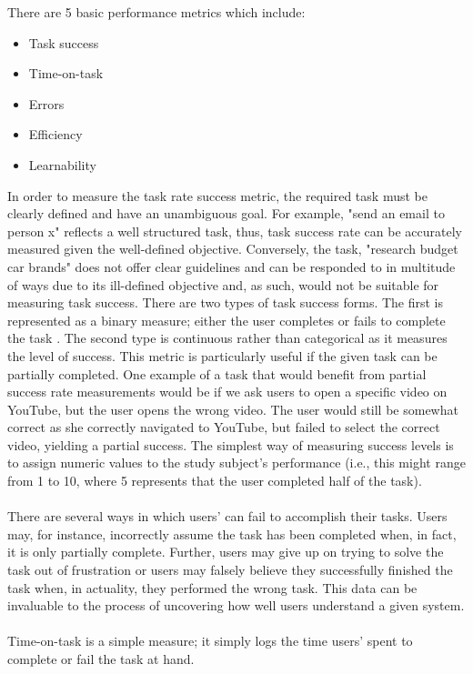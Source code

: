  There are 5 basic performance metrics which include: \cite{tullis_albert_2011} \begin{itemize}
\item Task success
\item Time-on-task
\item Errors
\item Efficiency
\item Learnability
\end{itemize}
In order to measure the task rate success metric, the required task must be clearly defined and have an unambiguous goal. For example, "send an email to person x" reflects a well structured task, thus, task success rate can be accurately measured given the well-defined objective. Conversely, the task, "research budget car brands" does not offer clear guidelines and can be responded to in multitude of ways due to its ill-defined objective and, as such, would not be suitable for measuring task success. There are two types of task success forms. The first is represented as a binary measure; either the user completes or fails to complete the task \cite{tullis_albert_2011}. The second type is continuous rather than categorical as it measures the level of success. This metric is particularly useful if the given task can be partially completed. One example of a task that would benefit from partial success rate measurements would be if we ask users to open a specific video on YouTube, but the user opens the wrong video. The user would still be somewhat correct as she correctly navigated to YouTube, but failed to select the correct video, yielding a partial success. The simplest way of measuring success levels is to assign numeric values to the study subject's performance (i.e., this might range from 1 to 10, where 5 represents that the user completed half of the task).
\\\\
There are several ways in which users' can fail to accomplish their tasks. Users may, for instance, incorrectly assume the task has been completed when, in fact, it is only partially complete. Further, users may give up on trying to solve the task out of frustration or users may falsely believe they successfully finished the task when, in actuality, they performed the wrong task. This data can be invaluable to the process of uncovering how well users understand a given system. 
\\\\
Time-on-task is a simple measure; it simply logs the time users' spent to complete or fail the task at hand.
